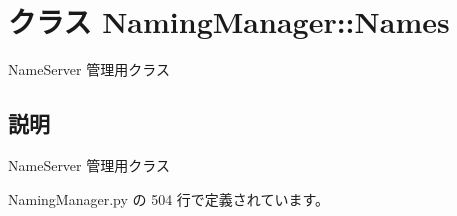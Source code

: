 \section{クラス NamingManager::Names}
\label{classsource__py_1_1_naming_manager_1_1_naming_manager_1_1_names}
NameServer 管理用クラス  




\subsection{説明}
NameServer 管理用クラス 

 NamingManager.py の 504 行で定義されています。